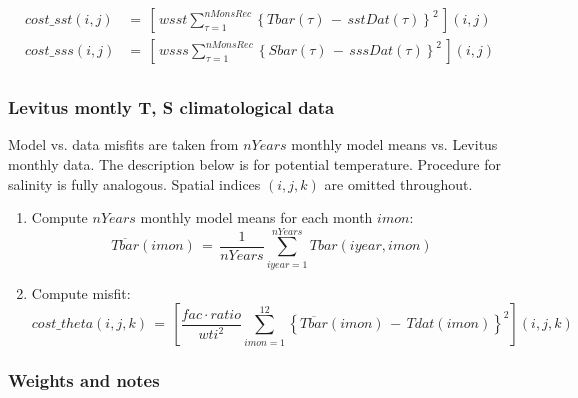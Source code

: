 \begin{equation}
\begin{aligned}
cost\_sst(i,j) & = \,
\left[ \, wsst \sum_{\tau=1}^{nMonsRec}
\left\{ Tbar(\tau) \, - \, sstDat(\tau) \right\}^2 \, \right](i,j)
 \\
cost\_sss(i,j) & = \,
\left[ \, wsss \sum_{\tau=1}^{nMonsRec}
\left\{ Sbar(\tau) \, - \, sssDat(\tau) \right\}^2 \, \right](i,j)
 \\
\end{aligned}
\end{equation}

\subsubsection{Levitus montly T, S climatological data}

Model vs. data misfits are taken from $nYears$ monthly model means
vs. Levitus monthly data.
The description below is for potential temperature.
Procedure for salinity is fully analogous.
Spatial indices $(i,j,k)$ are omitted throughout.
%
\begin{enumerate}
%
\item
Compute $nYears$ monthly model means for each month $imon$:
\[
\overline{Tbar}(imon) \, = \, \frac{1}{nYears} 
\sum_{iyear=1}^{nYears} Tbar(iyear,imon)
\]
%
\item
Compute misfit:
\[
cost\_theta(i,j,k) \, = \, \left[ 
\frac{fac \cdot ratio}{wti^2} \sum_{imon=1}^{12}
\left\{ \overline{Tbar}(imon) \, - \, Tdat(imon) \right\}^2  \right] (i,j,k)
\]

\end{enumerate}


\subsubsection{Weights and notes}

